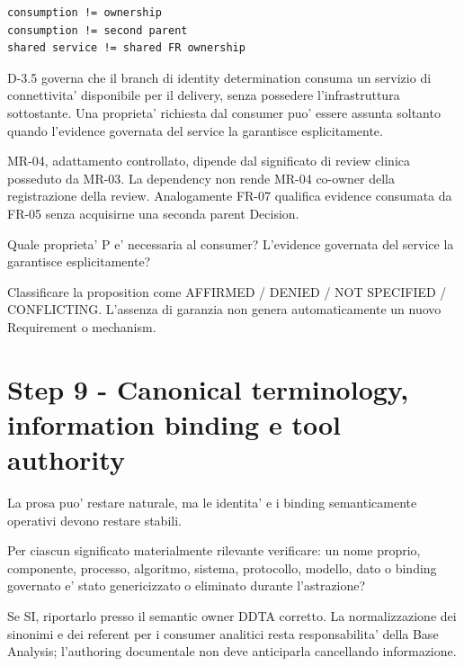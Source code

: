 \documentclass[11pt,a4paper]{article}
\begin{document}
\begin{lstlisting}
consumption != ownership
consumption != second parent
shared service != shared FR ownership
\end{lstlisting}

\begin{ddtaexample}[title={Facial Access - servizio di connettivita' consumato}]
D-3.5 governa che il branch di identity determination consuma un servizio di connettivita' disponibile per il delivery, senza possedere l'infrastruttura sottostante. Una proprieta' richiesta dal consumer puo' essere assunta soltanto quando l'evidence governata del service la garantisce esplicitamente.
\end{ddtaexample}

\begin{ddtaexample}[title={DermaTriage - dependency non e' ownership}]
MR-04, adattamento controllato, dipende dal significato di review clinica posseduto da MR-03. La dependency non rende MR-04 co-owner della registrazione della review. Analogamente FR-07 qualifica evidence consumata da FR-05 senza acquisirne una seconda parent Decision.
\end{ddtaexample}

\begin{ddtacheck}[title={Required property vs governed service guarantee}]
Quale proprieta' P e' necessaria al consumer? L'evidence governata del service la garantisce esplicitamente?\par
Classificare la proposition come AFFIRMED / DENIED / NOT SPECIFIED / CONFLICTING. L'assenza di garanzia non genera automaticamente un nuovo Requirement o mechanism.
\end{ddtacheck}

\section{Step 9 - Canonical terminology, information binding e tool authority}
\closedtag

La prosa puo' restare naturale, ma le identita' e i binding semanticamente operativi devono restare stabili.

\begin{ddtacheck}[title={A10 - information-preservation check}]
Per ciascun significato materialmente rilevante verificare: un nome proprio, componente, processo, algoritmo, sistema, protocollo, modello, dato o binding governato e' stato genericizzato o eliminato durante l'astrazione?\par
Se SI, riportarlo presso il semantic owner DDTA corretto. La normalizzazione dei sinonimi e dei referent per i consumer analitici resta responsabilita' della Base Analysis; l'authoring documentale non deve anticiparla cancellando informazione.
\end{ddtacheck}
\end{document}
